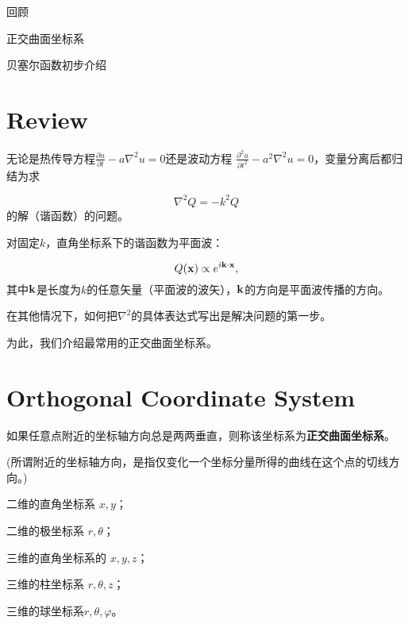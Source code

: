 \documentclass[CJK]{beamer}
\date{}
\begin{document}

\begin{frame}
\bch
\bitem
\item{回顾}
\item{正交曲面坐标系}
\item{贝塞尔函数初步介绍}    
\eitem
\ech
\end{frame}

\section{Review}


\begin{frame}
\bch
无论是热传导方程$\frac{\partial u}{\partial t} -a \nabla^2u = 0$还是波动方程
$\frac{\partial^2u }{\partial t^2} - a^2 \nabla^2 u = 0$，变量分离后都归结为求

$$ \nabla^2 Q = - k ^2 Q $$
的解（谐函数）的问题。

\ech
\end{frame}


\begin{frame}
\bch
对固定$k$，直角坐标系下的谐函数为平面波：

$$Q({\mathbf{x}}) \propto e^{{\dot{\imath}} {\mathbf{k}}\cdot {\mathbf{x}}}, $$
其中${\mathbf{k}}$是长度为$k$的任意矢量（平面波的波矢），${\mathbf{k}}$的方向是平面波传播的方向。
\ech
\end{frame}


\begin{frame}
\bch
在其他情况下，如何把$\nabla^2$的具体表达式写出是解决问题的第一步。

\skiplines

为此，我们介绍最常用的正交曲面坐标系。
\ech
\end{frame}


\section{Orthogonal Coordinate System}



\begin{frame}
\bch
如果任意点附近的坐标轴方向总是两两垂直，则称该坐标系为{\blue \bf 正交曲面坐标系}。

\skiplines
(所谓附近的坐标轴方向，是指仅变化一个坐标分量所得的曲线在这个点的切线方向。)

\skiplines
\bex
二维的直角坐标系 $x, y$；

二维的极坐标系 $r, \theta$；

三维的直角坐标系的 $x, y, z$；

三维的柱坐标系 $r, \theta, z$；

三维的球坐标系$ r, \theta, \varphi$。
\eex
\ech
\end{frame}
\end{document}
